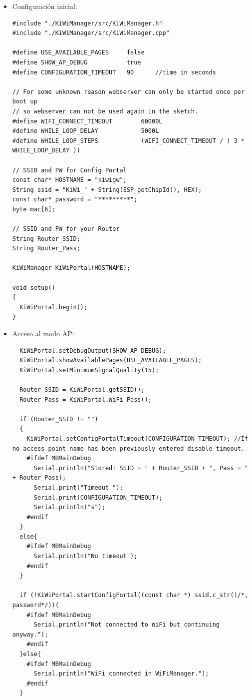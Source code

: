 \begin{itemize}
  \item Configuración inicial:

\begin{lstlisting}
#include "./KiWiManager/src/KiWiManager.h"
#include "./KiWiManager/src/KiWiManager.cpp"

#define USE_AVAILABLE_PAGES     false
#define SHOW_AP_DEBUG           true
#define CONFIGURATION_TIMEOUT   90      //time in seconds  

// For some unknown reason webserver can only be started once per boot up
// so webserver can not be used again in the sketch.
#define WIFI_CONNECT_TIMEOUT        60000L
#define WHILE_LOOP_DELAY            5000L
#define WHILE_LOOP_STEPS            (WIFI_CONNECT_TIMEOUT / ( 3 * WHILE_LOOP_DELAY ))

// SSID and PW for Config Portal
const char* HOSTNAME = "kiwigw";
String ssid = "KiWi_" + String(ESP_getChipId(), HEX);
const char* password = "*********";
byte mac[6];

// SSID and PW for your Router
String Router_SSID;
String Router_Pass;

KiWiManager KiWiPortal(HOSTNAME);

void setup()
{
  KiWiPortal.begin();
}
\end{lstlisting}

\item Acceso al modo AP:

\begin{lstlisting}
  KiWiPortal.setDebugOutput(SHOW_AP_DEBUG);
  KiWiPortal.showAvailablePages(USE_AVAILABLE_PAGES);
  KiWiPortal.setMinimumSignalQuality(15);

  Router_SSID = KiWiPortal.getSSID();
  Router_Pass = KiWiPortal.WiFi_Pass();

  if (Router_SSID != "")
  {
    KiWiPortal.setConfigPortalTimeout(CONFIGURATION_TIMEOUT); //If no access point name has been previously entered disable timeout.
    #ifdef MBMainDebug
      Serial.println("Stored: SSID = " + Router_SSID + ", Pass = " + Router_Pass);
      Serial.print("Timeout ");
      Serial.print(CONFIGURATION_TIMEOUT);
      Serial.println("s");
    #endif
  }
  else{
    #ifdef MBMainDebug
      Serial.println("No timeout");
    #endif
  }

  if (!KiWiPortal.startConfigPortal((const char *) ssid.c_str()/*, password*/)){
    #ifdef MBMainDebug
      Serial.println("Not connected to WiFi but continuing anyway.");
    #endif
  }else{
    #ifdef MBMainDebug 
      Serial.println("WiFi connected in WiFiManager.");
    #endif
  }
\end{lstlisting}
  

\end{itemize}
